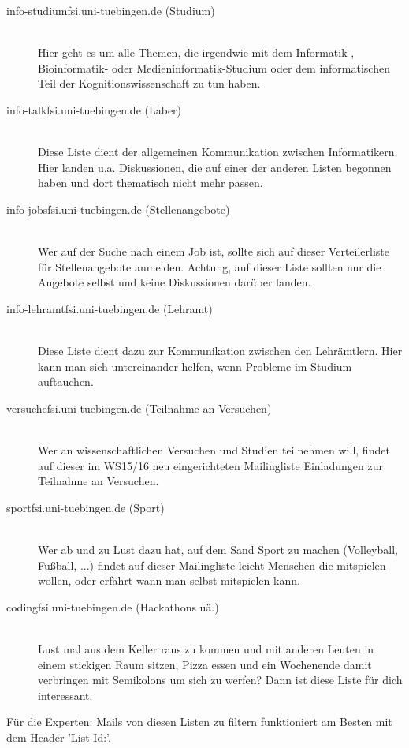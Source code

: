 \begin{description}

  \item[info-studium\At fsi.uni-tuebingen.de (Studium)] ~\\
    Hier geht es um alle Themen, die irgendwie mit dem Informatik-, Bioinformatik- oder Medieninformatik-Studium
    oder dem informatischen Teil der Kognitionswissenschaft zu tun haben. 


  \item[info-talk\At fsi.uni-tuebingen.de (Laber)] ~\\
    Diese Liste dient der allgemeinen Kommunikation zwischen Informatikern.
    Hier landen u.a. Diskussionen, die auf einer der anderen Listen begonnen
    haben und dort thematisch nicht mehr passen.


  \item[info-jobs\At fsi.uni-tuebingen.de (Stellenangebote)] ~\\
    Wer auf der Suche nach einem Job ist, sollte sich auf dieser Verteilerliste
    für Stellenangebote anmelden. Achtung, auf dieser Liste sollten nur die
    Angebote selbst und keine Diskussionen darüber landen.


  \item[info-lehramt\At fsi.uni-tuebingen.de (Lehramt)] ~\\
  Diese Liste dient dazu zur Kommunikation zwischen den Lehrämtlern. Hier kann man sich untereinander helfen, wenn Probleme im Studium auftauchen.
  
  
  \item[versuche\At fsi.uni-tuebingen.de (Teilnahme an Versuchen)] ~\\
    Wer an wissenschaftlichen Versuchen und Studien teilnehmen will, findet auf dieser 
    im WS15/16 neu eingerichteten Mailingliste Einladungen zur Teilnahme an Versuchen.
  
    
  \item[sport\At fsi.uni-tuebingen.de (Sport)] ~\\
  	Wer ab und zu Lust dazu hat, auf dem Sand Sport zu machen (Volleyball, Fußball, ...) findet auf dieser Mailingliste leicht Menschen die mitspielen wollen, oder erfährt wann man selbst mitspielen kann.
  	
  	
  \item[coding\At fsi.uni-tuebingen.de (Hackathons uä.)] ~\\
  	Lust mal aus dem Keller raus zu kommen und mit anderen Leuten in einem stickigen Raum sitzen, Pizza essen und ein Wochenende damit verbringen mit Semikolons um sich zu werfen? Dann ist diese Liste für dich interessant.
  	

\end{description}

Für die Experten: Mails von diesen Listen zu filtern funktioniert am Besten mit dem Header 'List-Id:'.
